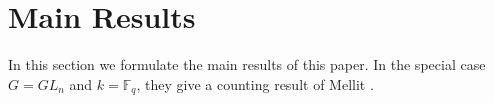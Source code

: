 \documentclass{amsart}
\theoremstyle{plain}
\newtheorem{proposition}{Proposition}[section]
\newtheorem{fact}{Fact}[section]
\theoremstyle{definition}
\theoremstyle{remark}
\newtheorem{remark}{Remark}[section]
\begin{document}
\section{Main Results}\label{Main result}
In this section we formulate the main results of this paper. In the special case $G=GL_n$ and $k=\mathbb{F}_{q}$, they give a counting result of Mellit \cite[Section 5.4]{Mel}.
\end{document}
